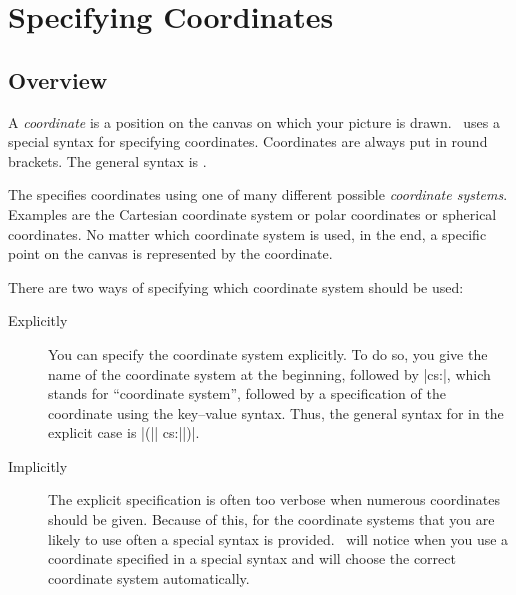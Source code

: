 %
%
%


\section{Specifying Coordinates}

\subsection{Overview}

A \emph{coordinate} is a position on the canvas on which your picture is drawn.
\tikzname\ uses a special syntax for specifying coordinates. Coordinates are
always put in round brackets. The general syntax is
.

The  specifies coordinates using one of many
different possible \emph{coordinate systems}. Examples are the Cartesian
coordinate system or polar coordinates or spherical coordinates. No matter
which coordinate system is used, in the end, a specific point on the canvas is
represented by the coordinate.

There are two ways of specifying which coordinate system should be used:
%
\begin{description}
    \item[Explicitly] You can specify the coordinate system explicitly. To do
        so, you give the name of the coordinate system at the beginning,
        followed by |cs:|, which stands for ``coordinate system'', followed by
        a specification of the coordinate using the key--value syntax. Thus,
        the general syntax for  in the explicit
        case is |(|| cs:||)|.
    \item[Implicitly] The explicit specification is often too verbose when
        numerous coordinates should be given. Because of this, for the
        coordinate systems that you are likely to use often a special syntax
        is provided. \tikzname\ will notice when you use a coordinate
        specified in a special syntax and will choose the correct coordinate
        system automatically.
\end{description}

